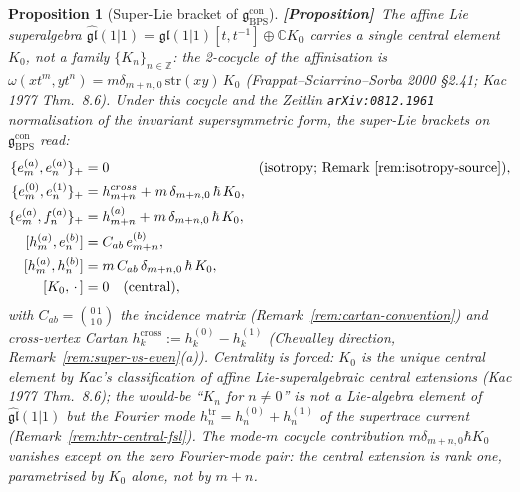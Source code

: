 \documentclass[11pt]{amsart}
\newtheorem{proposition}[theorem]{Proposition}
\theoremstyle{definition}
\providecommand{\bZ}{\mathbb{Z}}
\providecommand{\bC}{\mathbb{C}}
\providecommand{\fgl}{\mathfrak{gl}}
\providecommand{\fg}{\mathfrak{g}}
\providecommand{\ClaimStatusProposition}{\textbf{\textsf{[Proposition]}}}
\begin{document}
\begin{proposition}[Super-Lie bracket of $\fg_{\mathrm{BPS}}^{\mathrm{con}}$]
\label{prop:super-brackets}
\ClaimStatusProposition\
The affine Lie superalgebra $\widehat{\fgl}(1|1) = \fgl(1|1)[t, t^{-1}]
\oplus \bC K_0$ carries a \emph{single} central element $K_0$, not a
family $\{K_n\}_{n \in \bZ}$: the 2-cocycle of the affinisation is
$\omega(x t^m, y t^n) = m \delta_{m+n, 0}\, \mathrm{str}(xy)\, K_0$
(Frappat--Sciarrino--Sorba 2000 §2.41; Kac 1977 Thm.~8.6). Under this
cocycle and the Zeitlin \texttt{arXiv:0812.1961} normalisation of the
invariant supersymmetric form, the super-Lie brackets on
$\fg_{\mathrm{BPS}}^{\mathrm{con}}$ read:
\[
\begin{aligned}
  \{e^{(a)}_m, e^{(a)}_n\}_+ &= 0
    &&\text{(isotropy; Remark~\ref{rem:isotropy-source}),} \\
  \{e^{(0)}_m, e^{(1)}_n\}_+ &= h^{\mathrm{cross}}_{m+n}
    + m\,\delta_{m+n,0}\,\hbar\,K_0, \\
  \{e^{(a)}_m, f^{(a)}_n\}_+ &= h^{(a)}_{m+n}
    + m\,\delta_{m+n,0}\,\hbar\,K_0, \\
  [h^{(a)}_m, e^{(b)}_n] &= C_{ab}\,e^{(b)}_{m+n}, \\
  [h^{(a)}_m, h^{(b)}_n] &= m\,C_{ab}\,\delta_{m+n,0}\,\hbar\,K_0, \\
  [K_0, \,\cdot\,] &= 0 \quad \text{(central)},
\end{aligned}
\]
with $C_{ab} = \binom{0\,1}{1\,0}$ the incidence matrix
(Remark~\ref{rem:cartan-convention}) and cross-vertex Cartan
$h^{\mathrm{cross}}_k := h^{(0)}_k - h^{(1)}_k$ (Chevalley direction,
Remark~\ref{rem:super-vs-even}(a)). Centrality is forced: $K_0$ is the
unique central element by Kac's classification of affine
Lie-superalgebraic central extensions (Kac 1977 Thm.~8.6); the
would-be ``$K_n$ for $n \neq 0$'' is not a Lie-algebra element of
$\widehat{\fgl}(1|1)$ but the Fourier mode $h^{\mathrm{tr}}_n =
h^{(0)}_n + h^{(1)}_n$ of the supertrace current
(Remark~\ref{rem:htr-central-fsl}). The mode-$m$ cocycle contribution
$m \delta_{m+n, 0} \hbar K_0$ vanishes except on the zero Fourier-mode
pair: the central extension is rank one, parametrised by $K_0$ alone,
not by $m + n$.
\end{proposition}
\end{document}
